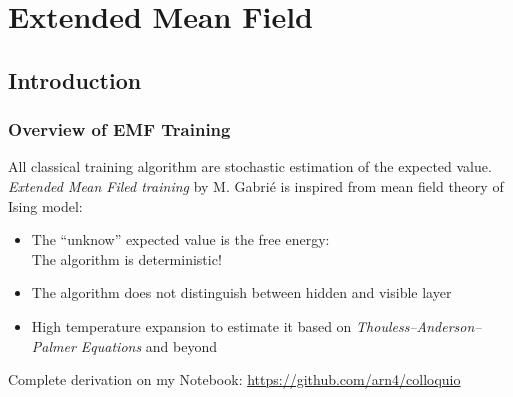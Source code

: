 


\section{Extended Mean Field}
\subsection{Introduction}
\begin{frame}
  \frametitle{Overview of EMF Training}
  All classical training algorithm are \alert{stochastic}  estimation of the expected value. \\
  \emph{Extended Mean Filed training} by M. Gabrié \cite{gabrie18training} is inspired from mean field theory 
  of Ising model:
  \begin{itemize}
    \item The ``unknow'' expected value is the \alert{free energy}: \\
          The algorithm is \alert{deterministic}!
    \item The algorithm does not distinguish between hidden and visible layer
    \item High temperature expansion to estimate it based on \emph{Thouless–Anderson–Palmer Equations} \cite{georges1991expand}
          and beyond
  \end{itemize}
  Complete derivation on my Notebook: \url{https://github.com/arn4/colloquio}
\end{frame}


